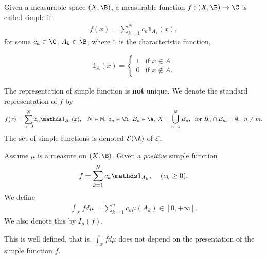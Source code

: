 \begin{definition}
    Given a measurable space $(X,\B)$, a measurable function $f:(X,\B)\rightarrow \C$ is called simple if 
    \begin{align}
    f(x) = \sum_{k=1}^{N}c_k\mathds 1_{A_k}(x),    
    \end{align}
for some $c_k\in\C$, $A_k\in \B$, where $\mathds 1$ is the characteristic function,

\begin{align}
    \mathds 1_{A}(x)= \begin{cases} 
        1 & \text{if } x\in A \\
        0 & \text{if } x\notin A.
     \end{cases}
\end{align}

The representation of simple function is \textbf{not} unique. We denote the standard representation of
$f$ by \begin{align}
    f(x) = \sum_{n=0}^{N}z_n\mathds 1_{B_n}(x),\hspace{3mm} N\in\mathbb N,\hspace{1mm} z_n\in\R,\hspace{1mm} B_n\in\A,\hspace{1mm} X=\bigcup_{n=1}^N B_n,\hspace{2mm}\text{for } B_n\cap B_m=\emptyset,\hspace{2mm} n\neq m.
\end{align}
The set of simple functions is denoted $\mathcal E(\A)$ of $\mathcal E$. 

\end{definition}
\begin{definition}
    Assume $\mu$ is a measure on $(X,\B)$. Given a \textit{positive} simple function
    \begin{align}
        f = \sum_{k=1}^{N}c_k\mathds 1_{A_k},\hspace{4mm} (c_k\geq 0).
    \end{align}
    We define \begin{align}
        \int_X fd\mu =\sum_{k=1}^{n}c_k\mu(A_k)\in [0,+\infty].
    \end{align}
    We also denote this by $I_\mu(f)$.
\end{definition}

\begin{lemma}
    This is well defined, that is, $\int_x fd\mu$ does not depend on the presentation of the simple function $f$.
\end{lemma}

